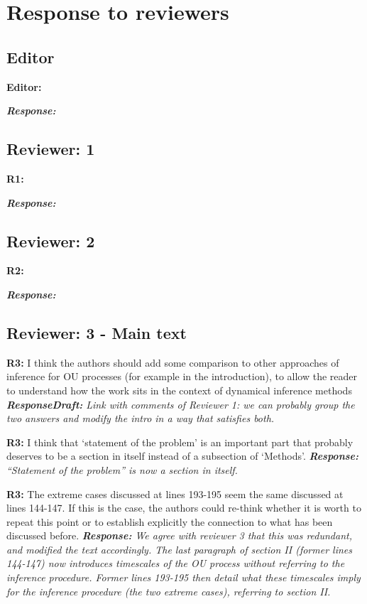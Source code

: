\documentclass[aps,rmp,onecolumn]{revtex4-1}
\newcommand{\refa}[1]{\textbf{R1:} #1\vskip 5mm}
\newcommand{\refb}[1]{\textbf{R2:} #1\vskip 5mm}
\newcommand{\refc}[1]{\textbf{R3:} #1\vskip 5mm}
\newcommand{\editor}[1]{\textbf{Editor:} #1\vskip 5mm}
\newcommand{\response}[1]{{\it {\color{response}\textbf{Response:} #1}}\vskip 5mm}
\newcommand{\responsedraft}[1]{{\it {\color{purple}\textbf{ResponseDraft:} #1}}\vskip 5mm}
\begin{document}
\section*{Response to reviewers}

\subsection*{Editor}


\editor{}

\response{}



\subsection*{Reviewer: 1}

\refa{}

\response{}


\subsection*{Reviewer: 2}

\refb{
}

\response{}

\subsection*{Reviewer: 3 - Main text}


\refc{I think the authors should add some comparison to other approaches of inference for OU processes (for example in the introduction), to allow the reader to understand how the work sits in the context of dynamical inference methods}
\responsedraft{Link with comments of Reviewer 1: we can probably group the two answers and modify the intro in a way that satisfies both.}

\refc{I think that ‘statement of the problem’ is an important part that probably deserves to be a section in itself instead of a subsection of ‘Methods’.}
\response{``Statement of the problem'' is now a section in itself.}

\refc{The extreme cases discussed at lines 193-195 seem the same discussed at lines 144-147. If this is the case, the authors could re-think whether it is worth to repeat this point or to establish explicitly the connection to what has been discussed before.}
\response{We agree with reviewer 3 that this was redundant, and modified the text accordingly. 
The last paragraph of section II (former lines 144-147) now introduces timescales of the OU process without referring to the inference procedure. 
Former lines 193-195 then detail what these timescales imply for the inference procedure (the two extreme cases), referring to section II.}
\end{document}

